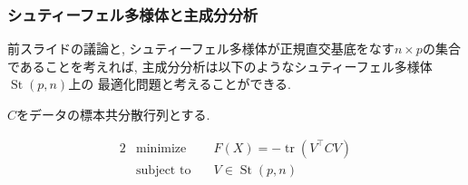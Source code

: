 \documentclass[dvipdfmx,11pt]{beamer}		%
\makeatletter
\newcounter{mpproblem}[section]
\newenvironment{mpproblem}[1]%
{%
    \protected@edef\@currentlabelname{#1}%
    \par\vspace{\baselineskip}\noindent%
    \ifx#1\empty %
    \else \refstepcounter{mpproblem}$($#1$)$ %
    \fi%
    \hfill%
    $\left|%
    \hfill%
    \hspace{0.00\textwidth}%
    \@fleqntrue\@mathmargin\parindent%
    \begin{minipage}{0.86\textwidth}%
    \vspace{-1.0\baselineskip}%
}%
{%
    \end{minipage}%
    \@fleqnfalse%
    \right.$%
    \par\vspace{\baselineskip}\noindent%
    \ignorespacesafterend%
}%
\newenvironment{mpproblem*}%
{%
    \begin{mpproblem}{}%
}%
{%
    \end{mpproblem}%
    \ignorespacesafterend%
}
\makeatother
\begin{document}
    \begin{frame}
        \frametitle{シュティーフェル多様体と主成分分析}
        前スライドの議論と, シュティーフェル多様体が正規直交基底をなす$n\times p$の集合
        であることを考えれば, 主成分分析は以下のようなシュティーフェル多様体$\operatorname{St}(p, n)$上の
        最適化問題と考えることができる. 
        \begin{exampleblock}{}
            $C$をデータの標本共分散行列とする.
            \begin{mpproblem*}
                \begin{alignat*}{2}
                    &\text{minimize}   & \quad F(X) = - \operatorname{tr}(V^{\top}CV)\\
                    &\text{subject to} & \quad V\in\operatorname{St}(p, n)   
                \end{alignat*}
            \end{mpproblem*}
        \end{exampleblock}   
    \end{frame}
\end{document}
